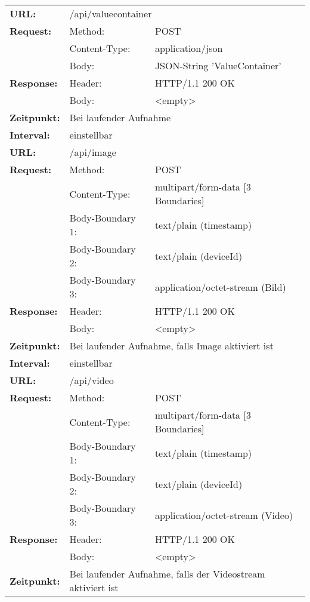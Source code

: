 {\renewcommand{\arraystretch}{1}
    \begin{longtable}{ p{2.5cm} p{3.5cm} p{6cm}}
	\textbf{URL:} & \multicolumn{2}{p{10cm}}{/api/valuecontainer} \\
	\textbf{Request:} & Method: & POST \\
		& Content-Type: & application/json \\
		& Body: & JSON-String 'ValueContainer'\\
	\textbf{Response:} & Header: & HTTP/1.1 200 OK \\
		& Body: & <empty> \\
	\textbf{Zeitpunkt:} & \multicolumn{2}{p{10cm}}{Bei laufender Aufnahme} \\ 
	\textbf{Interval:} & \multicolumn{2}{p{10cm}}{einstellbar} \\
\hline
\hline
	\textbf{URL:} & \multicolumn{2}{p{10cm}}{/api/image} \\
	\textbf{Request:} & Method: & POST \\
		& Content-Type: & multipart/form-data [3 Boundaries] \\
		& Body-Boundary 1: & text/plain (timestamp) \\
		& Body-Boundary 2: & text/plain (deviceId) \\
		& Body-Boundary 3: & application/octet-stream (Bild) \\
	\textbf{Response:} & Header: & HTTP/1.1 200 OK \\
		& Body: & <empty> \\
	\textbf{Zeitpunkt:} & \multicolumn{2}{p{10cm}}{Bei laufender Aufnahme, falls Image aktiviert ist} \\ 
	\textbf{Interval:} & \multicolumn{2}{p{10cm}}{einstellbar} \\
\hline
\hline
	\textbf{URL:} & \multicolumn{2}{p{10cm}}{/api/video} \\
	\textbf{Request:} & Method: & POST \\
		& Content-Type: & multipart/form-data [3 Boundaries] \\
		& Body-Boundary 1: & text/plain (timestamp) \\
		& Body-Boundary 2: & text/plain (deviceId) \\
		& Body-Boundary 3: & application/octet-stream (Video) \\
	\textbf{Response:} & Header: & HTTP/1.1 200 OK \\
		& Body: & <empty> \\
	\textbf{Zeitpunkt:} & \multicolumn{2}{p{10cm}}{Bei laufender Aufnahme, falls der Videostream aktiviert ist} \\ 

\end{longtable}}
